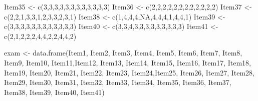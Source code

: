 \documentclass[
  english,
]{book}
\newenvironment{Shaded}{\begin{snugshade}}{\end{snugshade}}
\newcommand{\ConstantTok}[1]{\textcolor[rgb]{0.00,0.00,0.00}{#1}}
\newcommand{\DecValTok}[1]{\textcolor[rgb]{0.00,0.00,0.81}{#1}}
\newcommand{\FunctionTok}[1]{\textcolor[rgb]{0.00,0.00,0.00}{#1}}
\newcommand{\NormalTok}[1]{#1}
\newcommand{\OtherTok}[1]{\textcolor[rgb]{0.56,0.35,0.01}{#1}}
\begin{document}
\begin{Shaded}
\begin{Highlighting}[]
\NormalTok{Item35 }\OtherTok{\textless{}{-}} \FunctionTok{c}\NormalTok{(}\DecValTok{3}\NormalTok{,}\DecValTok{3}\NormalTok{,}\DecValTok{3}\NormalTok{,}\DecValTok{3}\NormalTok{,}\DecValTok{3}\NormalTok{,}\DecValTok{3}\NormalTok{,}\DecValTok{3}\NormalTok{,}\DecValTok{3}\NormalTok{,}\DecValTok{3}\NormalTok{,}\DecValTok{3}\NormalTok{,}\DecValTok{3}\NormalTok{,}\DecValTok{3}\NormalTok{)}
\NormalTok{Item36 }\OtherTok{\textless{}{-}} \FunctionTok{c}\NormalTok{(}\DecValTok{2}\NormalTok{,}\DecValTok{2}\NormalTok{,}\DecValTok{2}\NormalTok{,}\DecValTok{2}\NormalTok{,}\DecValTok{2}\NormalTok{,}\DecValTok{2}\NormalTok{,}\DecValTok{2}\NormalTok{,}\DecValTok{2}\NormalTok{,}\DecValTok{2}\NormalTok{,}\DecValTok{2}\NormalTok{,}\DecValTok{2}\NormalTok{,}\DecValTok{2}\NormalTok{)}
\NormalTok{Item37 }\OtherTok{\textless{}{-}} \FunctionTok{c}\NormalTok{(}\DecValTok{2}\NormalTok{,}\DecValTok{2}\NormalTok{,}\DecValTok{1}\NormalTok{,}\DecValTok{3}\NormalTok{,}\DecValTok{3}\NormalTok{,}\DecValTok{1}\NormalTok{,}\DecValTok{2}\NormalTok{,}\DecValTok{3}\NormalTok{,}\DecValTok{3}\NormalTok{,}\DecValTok{2}\NormalTok{,}\DecValTok{3}\NormalTok{,}\DecValTok{1}\NormalTok{)}
\NormalTok{Item38 }\OtherTok{\textless{}{-}} \FunctionTok{c}\NormalTok{(}\DecValTok{1}\NormalTok{,}\DecValTok{4}\NormalTok{,}\DecValTok{4}\NormalTok{,}\DecValTok{4}\NormalTok{,}\ConstantTok{NA}\NormalTok{,}\DecValTok{4}\NormalTok{,}\DecValTok{4}\NormalTok{,}\DecValTok{4}\NormalTok{,}\DecValTok{1}\NormalTok{,}\DecValTok{4}\NormalTok{,}\DecValTok{4}\NormalTok{,}\DecValTok{1}\NormalTok{)}
\NormalTok{Item39 }\OtherTok{\textless{}{-}} \FunctionTok{c}\NormalTok{(}\DecValTok{3}\NormalTok{,}\DecValTok{3}\NormalTok{,}\DecValTok{3}\NormalTok{,}\DecValTok{3}\NormalTok{,}\DecValTok{3}\NormalTok{,}\DecValTok{3}\NormalTok{,}\DecValTok{3}\NormalTok{,}\DecValTok{3}\NormalTok{,}\DecValTok{3}\NormalTok{,}\DecValTok{3}\NormalTok{,}\DecValTok{3}\NormalTok{,}\DecValTok{3}\NormalTok{)}
\NormalTok{Item40 }\OtherTok{\textless{}{-}} \FunctionTok{c}\NormalTok{(}\DecValTok{3}\NormalTok{,}\DecValTok{3}\NormalTok{,}\DecValTok{4}\NormalTok{,}\DecValTok{3}\NormalTok{,}\DecValTok{3}\NormalTok{,}\DecValTok{3}\NormalTok{,}\DecValTok{3}\NormalTok{,}\DecValTok{3}\NormalTok{,}\DecValTok{3}\NormalTok{,}\DecValTok{3}\NormalTok{,}\DecValTok{3}\NormalTok{,}\DecValTok{3}\NormalTok{)}
\NormalTok{Item41 }\OtherTok{\textless{}{-}} \FunctionTok{c}\NormalTok{(}\DecValTok{2}\NormalTok{,}\DecValTok{1}\NormalTok{,}\DecValTok{2}\NormalTok{,}\DecValTok{2}\NormalTok{,}\DecValTok{2}\NormalTok{,}\DecValTok{4}\NormalTok{,}\DecValTok{4}\NormalTok{,}\DecValTok{2}\NormalTok{,}\DecValTok{2}\NormalTok{,}\DecValTok{4}\NormalTok{,}\DecValTok{4}\NormalTok{,}\DecValTok{2}\NormalTok{)}

\NormalTok{exam }\OtherTok{\textless{}{-}} \FunctionTok{data.frame}\NormalTok{(Item1, Item2, Item3, Item4, Item5, Item6, Item7, Item8, Item9, Item10, Item11,Item12, Item13, Item14, Item15, Item16, Item17, Item18, Item19, Item20, Item21, Item22, Item23, Item24,Item25, Item26, Item27, Item28, Item29, Item30, Item31, Item32, Item33, Item34, Item35, Item36, Item37, Item38, Item39, Item40, Item41)}
\end{Highlighting}
\end{Shaded}
\end{document}
